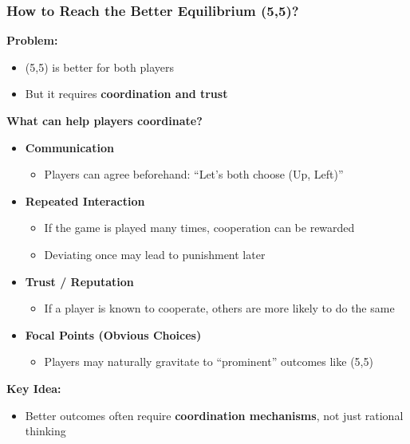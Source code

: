 \begin{frame}[fragile]\frametitle{How to Reach the Better Equilibrium (5,5)?}

\textbf{Problem:}
\begin{itemize}
  \item (5,5) is better for both players
  \item But it requires \textbf{coordination and trust}
\end{itemize}

\vspace{8pt}

\textbf{What can help players coordinate?}

\begin{itemize}
  \item \textbf{Communication}
  \begin{itemize}
    \item Players can agree beforehand: “Let’s both choose (Up, Left)”
  \end{itemize}
  
  \item \textbf{Repeated Interaction}
  \begin{itemize}
    \item If the game is played many times, cooperation can be rewarded
    \item Deviating once may lead to punishment later
  \end{itemize}
  
  \item \textbf{Trust / Reputation}
  \begin{itemize}
    \item If a player is known to cooperate, others are more likely to do the same
  \end{itemize}
  
  \item \textbf{Focal Points (Obvious Choices)}
  \begin{itemize}
    \item Players may naturally gravitate to “prominent” outcomes like (5,5)
  \end{itemize}
\end{itemize}

\vspace{6pt}

\textbf{Key Idea:}
\begin{itemize}
  \item Better outcomes often require \textbf{coordination mechanisms}, not just rational thinking
\end{itemize}

\end{frame}

